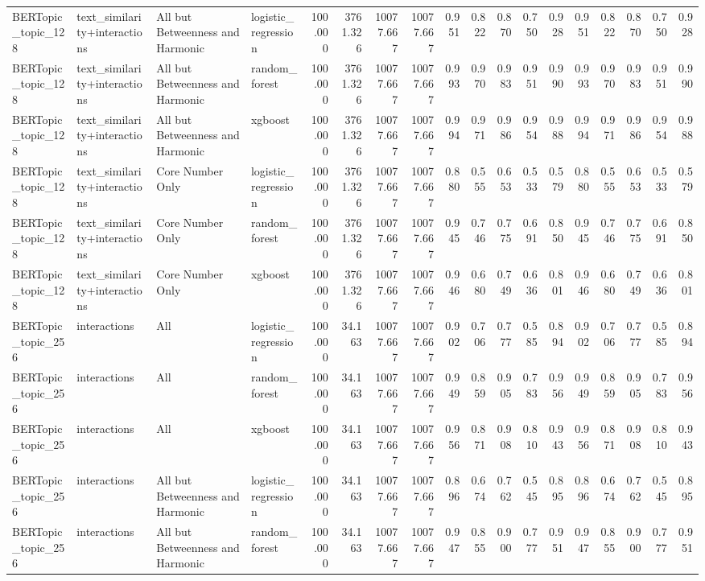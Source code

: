 \begin{tabular}{llllrrrrrrrrrrrrrr}
BERTopic_topic_128 & text_similarity+interactions & All but Betweenness and Harmonic & logistic_regression & 100.000 & 3761.326 & 10077.667 & 10077.667 & 0.951 & 0.822 & 0.870 & 0.750 & 0.928 & 0.951 & 0.822 & 0.870 & 0.750 & 0.928 \\
BERTopic_topic_128 & text_similarity+interactions & All but Betweenness and Harmonic & random_forest & 100.000 & 3761.326 & 10077.667 & 10077.667 & 0.993 & 0.970 & 0.983 & 0.951 & 0.990 & 0.993 & 0.970 & 0.983 & 0.951 & 0.990 \\
BERTopic_topic_128 & text_similarity+interactions & All but Betweenness and Harmonic & xgboost & 100.000 & 3761.326 & 10077.667 & 10077.667 & 0.994 & 0.971 & 0.986 & 0.954 & 0.988 & 0.994 & 0.971 & 0.986 & 0.954 & 0.988 \\
BERTopic_topic_128 & text_similarity+interactions & Core Number Only & logistic_regression & 100.000 & 3761.326 & 10077.667 & 10077.667 & 0.880 & 0.555 & 0.653 & 0.533 & 0.579 & 0.880 & 0.555 & 0.653 & 0.533 & 0.579 \\
BERTopic_topic_128 & text_similarity+interactions & Core Number Only & random_forest & 100.000 & 3761.326 & 10077.667 & 10077.667 & 0.945 & 0.746 & 0.775 & 0.691 & 0.850 & 0.945 & 0.746 & 0.775 & 0.691 & 0.850 \\
BERTopic_topic_128 & text_similarity+interactions & Core Number Only & xgboost & 100.000 & 3761.326 & 10077.667 & 10077.667 & 0.946 & 0.680 & 0.749 & 0.636 & 0.801 & 0.946 & 0.680 & 0.749 & 0.636 & 0.801 \\
BERTopic_topic_256 & interactions & All & logistic_regression & 100.000 & 34.163 & 10077.667 & 10077.667 & 0.902 & 0.706 & 0.777 & 0.585 & 0.894 & 0.902 & 0.706 & 0.777 & 0.585 & 0.894 \\
BERTopic_topic_256 & interactions & All & random_forest & 100.000 & 34.163 & 10077.667 & 10077.667 & 0.949 & 0.859 & 0.905 & 0.783 & 0.956 & 0.949 & 0.859 & 0.905 & 0.783 & 0.956 \\
BERTopic_topic_256 & interactions & All & xgboost & 100.000 & 34.163 & 10077.667 & 10077.667 & 0.956 & 0.871 & 0.908 & 0.810 & 0.943 & 0.956 & 0.871 & 0.908 & 0.810 & 0.943 \\
BERTopic_topic_256 & interactions & All but Betweenness and Harmonic & logistic_regression & 100.000 & 34.163 & 10077.667 & 10077.667 & 0.896 & 0.674 & 0.762 & 0.545 & 0.895 & 0.896 & 0.674 & 0.762 & 0.545 & 0.895 \\
BERTopic_topic_256 & interactions & All but Betweenness and Harmonic & random_forest & 100.000 & 34.163 & 10077.667 & 10077.667 & 0.947 & 0.855 & 0.900 & 0.777 & 0.951 & 0.947 & 0.855 & 0.900 & 0.777 & 0.951 \\

\end{tabular}

